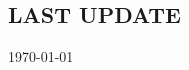 \documentclass[margin]{res}
\begin{document}
\begin{resume}

		


			
\section{LAST UPDATE} \today

\end{resume}
\end{document}
